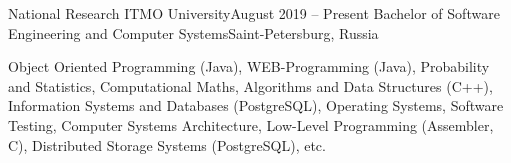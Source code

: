 

\begin{cvHeadingList}

  \cvCustomHeading
    {National Research ITMO University}{August 2019 – Present}
    {Bachelor of Software Engineering and Computer Systems}{Saint-Petersburg, Russia}

  \begin{cvList}
    \cvItem[Cources]
      Object Oriented Programming (Java),
      WEB-Programming (Java),
      Probability and Statistics,
      Computational Maths,
      Algorithms and Data Structures (C++),
      Information Systems and Databases (PostgreSQL),
      Operating Systems,
      Software Testing,
      Computer Systems Architecture,
      Low-Level Programming (Assembler, C),
      Distributed Storage Systems (PostgreSQL), etc.
  \end{cvList}

\end{cvHeadingList}
